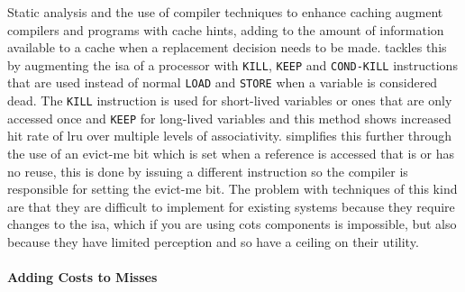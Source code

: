 Static analysis and the use of compiler techniques to enhance caching augment compilers and programs with cache hints, \textbf{}adding to the amount of information available to a cache when a replacement decision needs to be made. \citet{jainSoftwareassistedCacheReplacement2001} tackles this by augmenting the \gls{isa} of a processor with \texttt{KILL}, \texttt{KEEP} and \texttt{COND-KILL} instructions that are used instead of normal \texttt{LOAD} and \texttt{STORE} when a variable is considered dead. The \texttt{KILL} instruction is used for short-lived variables or ones that are only accessed once and \texttt{KEEP} for long-lived variables and this method shows increased hit rate of \gls{lru} over multiple levels of associativity. \citet{wangUsingCompilerImprove2002} simplifies this further through the use of an evict-me bit which is set when a reference is accessed that is  or has no reuse, this is done by issuing a different instruction so the compiler is responsible for setting the evict-me bit. The problem with techniques of this kind are that they are difficult to implement for existing systems because they require changes to the \gls{isa}, which if you are using \gls{cots} components is impossible, but also because they have limited perception and so have a ceiling on their utility.

\paragraph{Adding Costs to Misses}

